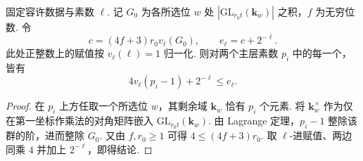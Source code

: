 \begin{lemma}[所选素数的比值赋值预算]
\label{lem:c-selmer-level-prime-loss}
\emitthmsource
固定容许数据与素数 $\ell$. 记 $G_0$ 为各所选位 $w$ 处 $|\mathrm{GL}_{r_0t}(\mathbf k_w)|$ 之积，$f$ 为无穷位数. 令
\[
 c=(4f+3)r_0 v_\ell(G_0),\qquad e_\ell=c+2^{-\ell}.
\]
此处正整数上的赋值按 $v_\ell(\ell)=1$ 归一化. 则对两个主层素数 $p_i$ 中的每一个，皆有
\[
 4v_\ell(p_i-1)+2^{-\ell}\le e_\ell .
\]
\end{lemma}
\begin{proof}
在 $p_i$ 上方任取一个所选位 $w$，其剩余域 $\mathbf k_w$ 恰有 $p_i$ 个元素. 将 $\mathbf k_w^\times$ 作为仅在第一坐标作乘法的对角矩阵嵌入 $\mathrm{GL}_{r_0t}(\mathbf k_w)$. 由 Lagrange 定理，$p_i-1$ 整除该群的阶，进而整除 $G_0$. 又由 $f,r_0\ge1$ 可得 $4\le(4f+3)r_0$. 取 $\ell$-进赋值、两边同乘 $4$ 并加上 $2^{-\ell}$，即得结论.
\end{proof}

